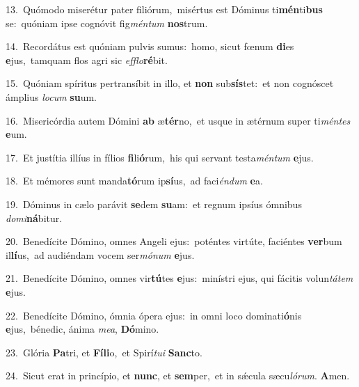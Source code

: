 {\numbfont\textcolor{\numbcolor}{13.}}~Quómodo miserétur pater filiórum,~\dagger misértus est Dóminus ti\-\textbf{mén}\-ti\textbf{bus} se:~\star quóniam ipse cognóvit fig\-\textit{mén}\-\textit{tum} \textbf{nos}\-trum.\par
{\numbfont\textcolor{\numbcolor}{14.}}~Recordátus est quóniam pulvis sumus:~\dagger homo, sicut fœnum \textbf{di}\-es \textbf{e}\-jus,~\star tamquam flos agri sic \textit{ef}\-\textit{flo}\textbf{ré}bit.\par
{\numbfont\textcolor{\numbcolor}{15.}}~Quóniam spíritus pertransíbit in illo, et \textbf{non} sub\-\textbf{sís}\-tet:~\star et non cognóscet ámplius \textit{lo}\-\textit{cum} \textbf{su}\-um.\par
{\numbfont\textcolor{\numbcolor}{16.}}~Misericórdia autem Dómini \textbf{ab} æ\-\textbf{tér}\-no,~\star et usque in ætérnum super ti\-\textit{mén}\-\textit{tes} \textbf{e}\-um.\par
{\numbfont\textcolor{\numbcolor}{17.}}~Et justítia illíus in fílios \textbf{fi}\-li\-\textbf{ó}\-rum,~\star his qui servant testa\-\textit{mén}\-\textit{tum} \textbf{e}\-jus.\par
{\numbfont\textcolor{\numbcolor}{18.}}~Et mémores sunt manda\-\textbf{tó}\-rum ip\-\textbf{sí}\-us,~\star ad faci\-\textit{én}\-\textit{dum} \textbf{e}\-a.\par
{\numbfont\textcolor{\numbcolor}{19.}}~Dóminus in cælo parávit \textbf{se}\-dem \textbf{su}\-am:~\star et regnum ipsíus ómnibus \textit{do}\-\textit{mi}\textbf{ná}bitur.\par
{\numbfont\textcolor{\numbcolor}{20.}}~Benedícite Dómino, omnes Angeli ejus:~\dagger poténtes virtúte, faciéntes \textbf{ver}\-bum il\-\textbf{lí}\-us,~\star ad audiéndam vocem ser\-\textit{mó}\-\textit{num} \textbf{e}\-jus.\par
{\numbfont\textcolor{\numbcolor}{21.}}~Benedícite Dómino, omnes vir\-\textbf{tú}\-tes \textbf{e}\-jus:~\star minístri ejus, qui fácitis volun\-\textit{tá}\-\textit{tem} \textbf{e}\-jus.\par
{\numbfont\textcolor{\numbcolor}{22.}}~Benedícite Dómino, ómnia ópera ejus:~\dagger in omni loco dominati\-\textbf{ó}\-nis \textbf{e}\-jus,~\star bénedic, ánima \textit{me}\-\textit{a}, \textbf{Dó}\-mino.\par
{\numbfont\textcolor{\numbcolor}{23.}}~Glória \textbf{Pa}\-tri, et \textbf{Fí}\-\textbf{li}o,~\star et Spirí\-\textit{tu}\-\textit{i} \textbf{Sanc}\-to.\par
{\numbfont\textcolor{\numbcolor}{24.}}~Sicut erat in princípio, et \textbf{nunc}\-, et \textbf{sem}\-per,~\star et in sǽcula sæcu\-\textit{ló}\-\textit{rum}. \textbf{A}\-men.\par
